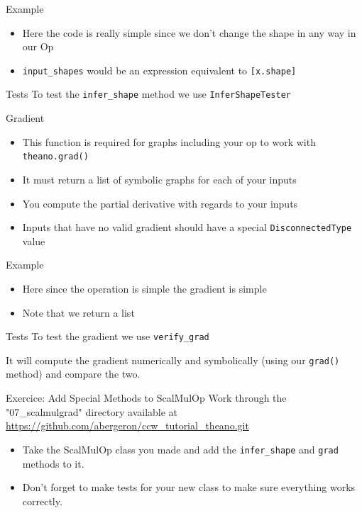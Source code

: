 \documentclass[utf8x]{beamer}
\newcommand{\code}[1]{\lstinline[emph={[2]}]|#1|}
\begin{document}
\begin{frame}{Example}

\begin{itemize}
\item Here the code is really simple since we don't change the shape in any way in our Op
\item \code{input_shapes} would be an expression equivalent to \code{[x.shape]}
\end{itemize}
\end{frame}

\begin{frame}{Tests}
To test the \code{infer_shape} method we use \code{InferShapeTester}

\end{frame}

\begin{frame}{Gradient}

\begin{itemize}
\item This function is required for graphs including your op to work with \code{theano.grad()}
\item It must return a list of symbolic graphs for each of your inputs
\item You compute the partial derivative with regards to your inputs
\item Inputs that have no valid gradient should have a special \code{DisconnectedType} value
\end{itemize}
\end{frame}

\begin{frame}{Example}

\begin{itemize}
\item Here since the operation is simple the gradient is simple
\item Note that we return a list
\end{itemize}
\end{frame}

\begin{frame}{Tests}
To test the gradient we use \code{verify_grad}

It will compute the gradient numerically and symbolically (using our \code{grad()} method) and compare the two.
\end{frame}

\begin{frame}{Exercice: Add Special Methods to ScalMulOp}
Work through the "07\_scalmulgrad" directory available at \url{https://github.com/abergeron/ccw_tutorial_theano.git}
\begin{itemize}
\item Take the ScalMulOp class you made and add the \code{infer_shape} and \code{grad} methods to it.
\item Don't forget to make tests for your new class to make sure everything works correctly.
\end{itemize}
\end{frame}
\end{document}
